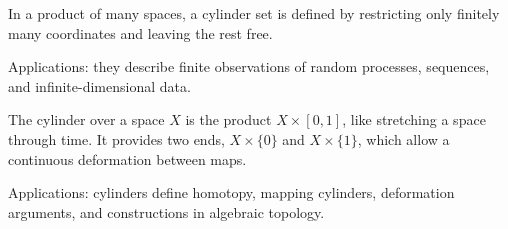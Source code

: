In a product of many spaces, a cylinder set is defined by restricting only finitely many coordinates and leaving the rest free.  \par\noindent Applications: they describe finite observations of random processes, sequences, and infinite-dimensional data.

The cylinder over a space $X$ is the product $X\times[0,1]$, like stretching a space through time. It provides two ends, $X\times\{0\}$ and $X\times\{1\}$, which allow a continuous deformation between maps. \par\noindent Applications: cylinders define homotopy, mapping cylinders, deformation arguments, and constructions in algebraic topology.
